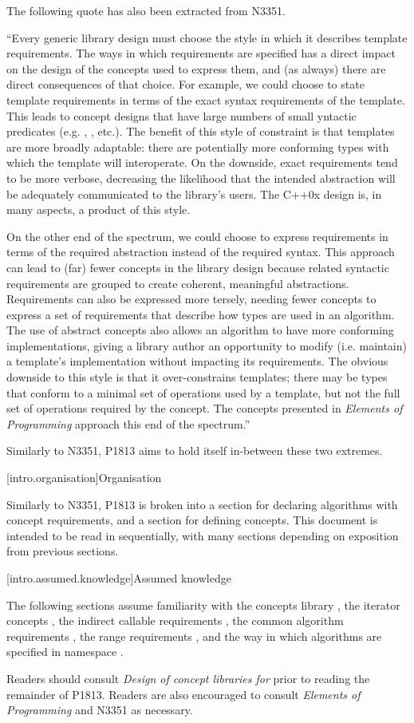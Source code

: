 The following quote has also been extracted from N3351.

``Every generic library design must choose the style in which it describes template requirements.
The ways in which requirements are specified has a direct impact on the design of the concepts
used to express them, and (as always) there are direct consequences of that choice. For example,
we could choose to state template requirements in terms of the exact syntax requirements of the
template. This leads to concept designs that have large numbers of small yntactic predicates (e.g.
, , etc.). The benefit of this style of constraint is that templates
are more broadly adaptable: there are potentially more conforming types with which the template will
interoperate. On the downside, exact requirements tend to be more verbose, decreasing the
likelihood that the intended abstraction will be adequately communicated to the library’s users.
The C++0x design is, in many aspects, a product of this style.

On the other end of the spectrum, we could choose to express requirements in terms of the required
abstraction instead of the required syntax. This approach can lead to (far) fewer concepts in the
library design because related syntactic requirements are grouped to create coherent, meaningful
abstractions. Requirements can also be expressed more tersely, needing fewer concepts to express a
set of requirements that describe how types are used in an algorithm. The use of abstract concepts
also allows an algorithm to have more conforming implementations, giving a library author an
opportunity to modify (i.e. maintain) a template’s implementation without impacting its
requirements. The obvious downside to this style is that it over-constrains templates; there may
be types that conform to a minimal set of operations used by a template, but not the full set of
operations required by the concept. The concepts presented in \textit{Elements of Programming}
approach this end of the spectrum.''

Similarly to N3351, P1813 aims to hold itself in-between these two extremes.

[intro.organisation]{Organisation}

Similarly to N3351, P1813 is broken into a section for declaring algorithms with concept
requirements, and a section for defining concepts. This document is intended to be read in
sequentially, with many sections depending on exposition from previous sections.

[intro.assumed.knowledge]{Assumed knowledge}

The following sections assume familiarity with the concepts library , the
iterator concepts , the indirect callable requirements
, the common algorithm requirements , the range
requirements , and the way in which algorithms are specified in namespace
 .

Readers should consult \textit{Design of concept libraries for \Cpp{}}\cite{concept-design} prior to
reading the remainder of P1813. Readers are also encouraged to consult \textit{Elements of
Programming}\cite{EoP} and N3351 as necessary.

